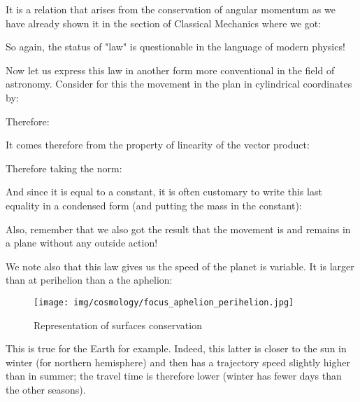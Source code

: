 	
	It is a relation that arises from the conservation of angular momentum as we have already shown it in the section of Classical Mechanics where we got:
	
	
	So again, the status of "law" is questionable in the language of modern physics!
	
	Now let us express this law in another form more conventional in the field of astronomy. Consider for this the movement in the plan in cylindrical coordinates by:
	
	Therefore:
	
	
	It comes therefore from the property of linearity of the vector product:
	
	Therefore taking the norm:
	
	And since it is equal to a constant, it is often customary to write this last equality in a condensed form (and putting the mass in the constant):
	
	Also, remember that we also got the result that the movement is and remains in a plane without any outside action!
	
	We note also that this law gives us the speed of the planet is variable. It is larger than at perihelion than a the aphelion:
	\begin{figure}[H]
		\begin{center}
		\texttt{[image: img/cosmology/focus\_aphelion\_perihelion.jpg]}
		\end{center}	
		\caption{Representation of surfaces conservation}
	\end{figure}
	This is true for the Earth for example. Indeed, this latter is closer to the sun in winter (for northern hemisphere) and then has a trajectory speed slightly higher than in summer; the travel time is therefore lower (winter has fewer days than the other seasons).
	
